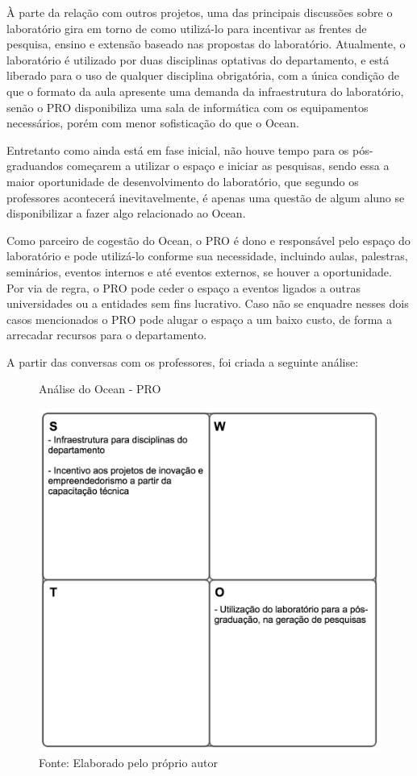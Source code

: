 À parte da relação com outros projetos, uma das principais discussões sobre o laboratório gira em torno de como utilizá-lo para incentivar as frentes de pesquisa, ensino e extensão baseado nas propostas do laboratório. Atualmente, o laboratório é utilizado por duas disciplinas optativas do departamento, e está liberado para o uso de qualquer disciplina obrigatória, com a única condição de que o formato da aula apresente uma demanda da infraestrutura do laboratório, senão o PRO disponibiliza uma sala de informática com os equipamentos necessários, porém com menor sofisticação do que o Ocean.

Entretanto como ainda está em fase inicial, não houve tempo para os pós-graduandos começarem a utilizar o espaço e iniciar as pesquisas, sendo essa a maior oportunidade de desenvolvimento do laboratório, que segundo os professores acontecerá inevitavelmente, é apenas uma questão de algum aluno se disponibilizar a fazer algo relacionado ao Ocean.

Como parceiro de cogestão do Ocean, o PRO é dono e responsável pelo espaço do laboratório e pode utilizá-lo conforme sua necessidade, incluindo aulas, palestras, seminários, eventos internos e até eventos externos, se houver a oportunidade. Por via de regra, o PRO pode ceder o espaço a eventos ligados a outras universidades ou a entidades sem fins lucrativo. Caso não se enquadre nesses dois casos mencionados o PRO pode alugar o espaço a um baixo custo, de forma a arrecadar recursos para o departamento.

A partir das conversas com os professores, foi criada a seguinte análise:

\begin{figure}[H]
\caption{Análise do Ocean - PRO}
\centerline{\includegraphics[scale=0.75]{img/proswot}}
\label{fig:swotpro}
\caption* {Fonte: Elaborado pelo próprio autor}
\end{figure}

